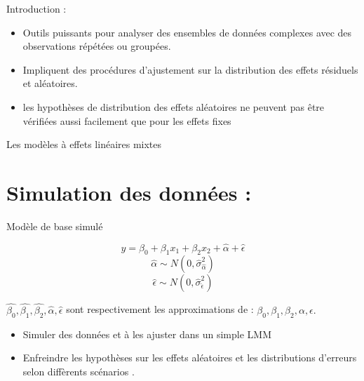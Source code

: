 \documentclass[unknownkeysallowed]{beamer}
\begin{document}
\begin{frame}{{Introduction :} }

 \begin{itemize}
        \item Outils puissants pour analyser des ensembles de données complexes avec des observations répétées ou groupées.
        \item Impliquent des procédures d'ajustement sur la distribution des effets résiduels et aléatoires.
        \item les hypothèses de distribution des effets aléatoires ne peuvent pas être vérifiées aussi facilement que pour les effets fixes 
    \end{itemize}
\end{frame}


\begin{frame}{Les modèles à effets linéaires mixtes}
\section{Simulation des données :}
\begin{alertblock}{Modèle de base simulé}


$$ y=\beta_0+\beta_1 x_1+\beta_2x_2+\hat{\alpha}+\hat{\epsilon}  $$
$$ \hat{\alpha} \sim  N(0,\hat{\sigma}^2_{\hat{\alpha}}) $$
$$ \hat{\epsilon} \sim  N(0,\hat{\sigma}^2_{\hat{\epsilon}}) $$

$\hat{\beta_0},\hat{\beta_1},\hat{\beta_2},\hat{\alpha},\hat{\epsilon}$     sont respectivement les approximations de :  $\beta_0,\beta_1,\beta_2,\alpha,\epsilon.$ 
\end{alertblock}

\medskip

 \begin{itemize}
        \item Simuler des données et à les ajuster dans un simple LMM
        \item Enfreindre les hypothèses sur les effets aléatoires et les distributions d'erreurs selon diffèrents scénarios .
   
    \end{itemize}
 
 


\end{frame}
  
\end{document}
